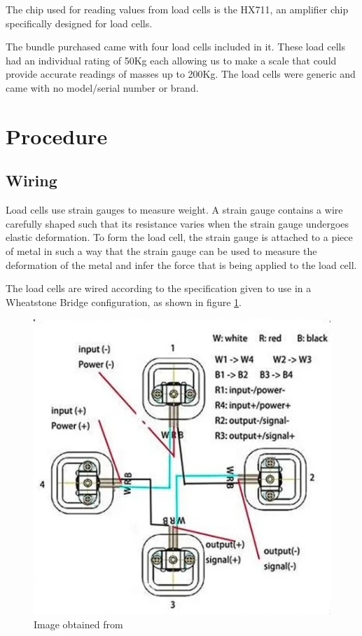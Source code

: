 \documentclass[letterpaper,11pt]{article}
\newcommand{\myLink}[2]{\href{#1}{\color{blue}\underline{\smash{\texttt{#2}}}}}
\begin{document}
The chip used for reading values from load cells is the HX711, an amplifier chip
specifically designed for load cells.

The bundle purchased came with four load cells included in it. These load cells
had an individual rating of 50Kg each allowing us to make a scale that could
provide accurate readings of masses up to 200Kg. The load cells were generic and
came with no model/serial number or brand.

\section{Procedure}
\subsection{Wiring}
Load cells use strain gauges to measure weight. A strain gauge contains a wire
carefully shaped such that its resistance varies when the strain gauge undergoes
elastic deformation. To form the load cell, the strain gauge is attached to a
piece of metal in such a way that the strain gauge can be used to measure the
deformation of the metal and infer the force that is being applied to the load
cell.

The load cells are wired according to the specification given to use in a
Wheatstone Bridge configuration, as shown in figure \ref{img:banggood}.

\begin{figure}[h]
  \centering
  \includegraphics[scale=.5]{loadcellwiring}
  \caption{Image obtained from
    \myLink{https://www.banggood.com/4pcs-DIY-50KG-Body-Load-Cell-Weight-Strain-Sensor-Resistance-With-HX711-AD-Module-p-1326815.html}{Bang
      Good}}
  \label{img:banggood}
\end{figure}
\end{document}

